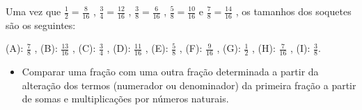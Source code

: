\begin{multicols}{2}
\begin{orientacoes}{}{}



\end{orientacoes}{}{}


\begin{solucao}{}{}
  Uma vez que   $\frac{1}{2} = \frac{8}{16}$  ,   $\frac{3}{4} = \frac{12}{16}$
,   $\frac{3}{8} = \frac{6}{16}$  ,   $\frac{5}{8} = \frac{10}{16}$   e
$\frac{7}{8} = \frac{14}{16}$  , os tamanhos dos soquetes são os seguintes:

  (A):   $\frac{7}{8}$  ,
  (B):   $\frac{13}{16}$  ,
  (C):   $\frac{3}{4}$  ,
  (D):   $\frac{11}{16}$  ,
  (E):   $\frac{5}{8}$  ,
  (F):   $\frac{9}{16}$  ,
  (G):   $\frac{1}{2}$  ,
  (H):   $\frac{7}{16}$  ,
  (I):   $\frac{3}{8}$.
\end{solucao}

\end{multicols}

\begin{objetivos}[label=chap4-ativ15]{}{}
\begin{itemize} %
    \item       Comparar uma fração com uma outra fração determinada a partir da
alteração dos termos (numerador ou denominador) da primeira fração a partir de
somas e multiplicações por números naturais.
\end{itemize} %
\end{objetivos}

